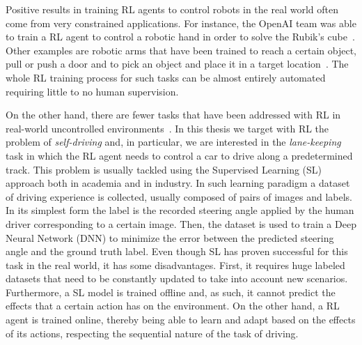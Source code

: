 Positive results in training RL agents to control robots in the real world often come from very constrained applications. For instance, the OpenAI team was able to train a RL agent to control a robotic hand in order to solve the Rubik's cube~\cite{rubik}. Other examples are robotic arms that have been trained to reach a certain object, pull or push a door and to pick an object and place it in a target location~\cite{gu2017deep}. The whole RL training process for such tasks can be almost entirely automated requiring little to no human supervision.

On the other hand, there are fewer tasks that have been addressed with RL in real-world uncontrolled environments~\cite{smith2022walk,DBLP:journals/corr/abs-2008-00715}. In this thesis we target with RL the problem of \textit{self-driving} and, in particular, we are interested in the \textit{lane-keeping} task in which the RL agent needs to control a car to drive along a predetermined track. This problem is usually tackled using the Supervised Learning (SL) approach both in academia and in industry. In such learning paradigm a dataset of driving experience is collected, usually composed of pairs of images and labels. In its simplest form the label is the recorded steering angle applied by the human driver corresponding to a certain image. Then, the dataset is used to train a Deep Neural Network (DNN) to minimize the error between the predicted steering angle and the ground truth label. Even though SL has proven successful for this task in the real world, it has some disadvantages. First, it requires huge labeled datasets that need to be constantly updated to take into account new scenarios. Furthermore, a SL model is trained offline and, as such, it cannot predict the effects that a certain action has on the environment. On the other hand, a RL agent is trained online, thereby being able to learn and adapt based on the effects of its actions, respecting the sequential nature of the task of driving.

